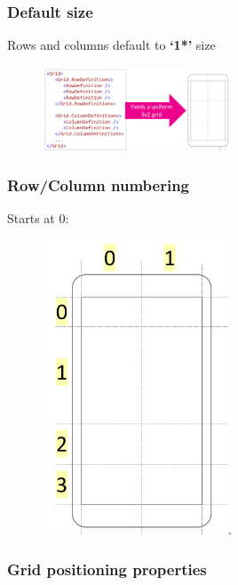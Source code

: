 \documentclass{article}
\newcommand{\bold}[1]{\textbf{#1}}
\begin{document}
\subsubsection{Default size}

Rows and columns default to \bold{`1*'} size

\begin{figure}[H]
    \centering
    \includegraphics[width=0.5\textwidth]{xaml-grid-defaultsize.png}
    \caption{}
\end{figure}

\subsubsection{Row/Column numbering}

Starts at 0:

\begin{figure}[H]
    \centering
    \includegraphics[width=0.5\textwidth]{xaml-grid-numbering.png}
    \caption{}
\end{figure}

\subsubsection{Grid positioning properties}
\end{document}
